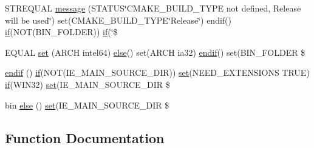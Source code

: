 \begin{DoxyCompactItemize}
\item 
S\+T\+R\+E\+Q\+U\+AL \hyperlink{CMakeLists_8txt_a5a0e1bdb38f357e7237b7fd6faec9bbc}{message} (S\+T\+A\+T\+US\char`\"{}C\+M\+A\+K\+E\+\_\+\+B\+U\+I\+L\+D\+\_\+\+T\+Y\+PE not defined, \textquotesingle{}Release\textquotesingle{} will be used\char`\"{}) set(C\+M\+A\+K\+E\+\_\+\+B\+U\+I\+L\+D\+\_\+\+T\+Y\+PE\char`\"{}Release\char`\"{}) endif() \hyperlink{thirdparty_2gflags_2test_2CMakeLists_8txt_a102cdd39d1229ea99555942b43b6a137}{if}(N\+OT(B\+I\+N\+\_\+\+F\+O\+L\+D\+ER)) \hyperlink{thirdparty_2gflags_2test_2CMakeLists_8txt_a102cdd39d1229ea99555942b43b6a137}{if}(\char`\"{}\$
\item 
E\+Q\+U\+AL \hyperlink{CMakeLists_8txt_a46e2761739db65cbc9fffd95f83fe7e3}{set} (A\+R\+CH intel64) \hyperlink{thirdparty_2gflags_2test_2CMakeLists_8txt_a3e479e7514d9f9c21fa0f4a1352bfbf9}{else}() set(A\+R\+CH ia32) \hyperlink{thirdparty_2gflags_2test_2CMakeLists_8txt_ac0f4e661f1b3de8d0e7e1b548fd08916}{endif}() set(B\+I\+N\+\_\+\+F\+O\+L\+D\+ER \$
\item 
\hyperlink{CMakeLists_8txt_a601231ef321c7ce6cbe923cf0840be76}{endif} () \hyperlink{thirdparty_2gflags_2test_2CMakeLists_8txt_a102cdd39d1229ea99555942b43b6a137}{if}(N\+OT(I\+E\+\_\+\+M\+A\+I\+N\+\_\+\+S\+O\+U\+R\+C\+E\+\_\+\+D\+IR)) \hyperlink{thirdparty_2gflags_2test_2CMakeLists_8txt_aed8cdd0ccd70519e5f2523d3a9f63075}{set}(N\+E\+E\+D\+\_\+\+E\+X\+T\+E\+N\+S\+I\+O\+NS T\+R\+UE) \hyperlink{thirdparty_2gflags_2test_2CMakeLists_8txt_a102cdd39d1229ea99555942b43b6a137}{if}(W\+I\+N32) \hyperlink{thirdparty_2gflags_2test_2CMakeLists_8txt_aed8cdd0ccd70519e5f2523d3a9f63075}{set}(I\+E\+\_\+\+M\+A\+I\+N\+\_\+\+S\+O\+U\+R\+C\+E\+\_\+\+D\+IR \$
\item 
bin \hyperlink{CMakeLists_8txt_a81cd398dfbd172465932087972b84bac}{else} () \hyperlink{thirdparty_2gflags_2test_2CMakeLists_8txt_aed8cdd0ccd70519e5f2523d3a9f63075}{set}(I\+E\+\_\+\+M\+A\+I\+N\+\_\+\+S\+O\+U\+R\+C\+E\+\_\+\+D\+IR \$
\end{DoxyCompactItemize}


\subsection{Function Documentation}
